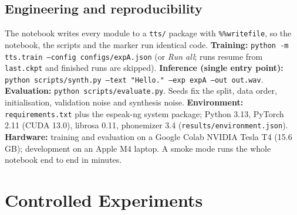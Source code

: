 \documentclass[11pt,a4paper]{article}
\begin{document}
\subsection{Engineering and reproducibility}
The notebook writes every module to a \texttt{tts/} package with \texttt{\%\%writefile}, so the notebook, the scripts and the marker run identical code. \textbf{Training:} \texttt{python -m tts.train --config configs/expA.json} (or \emph{Run all}; runs resume from \texttt{last.ckpt} and finished runs are skipped). \textbf{Inference (single entry point):} \texttt{python scripts/synth.py --text "Hello." --exp expA --out out.wav}. \textbf{Evaluation:} \texttt{python scripts/evaluate.py}. Seeds fix the split, data order, initialisation, validation noise and synthesis noise. \textbf{Environment:} \texttt{requirements.txt} plus the espeak-ng system package; Python 3.13, PyTorch 2.11 (CUDA 13.0), librosa 0.11, phonemizer 3.4 (\texttt{results/environment.json}). \textbf{Hardware:} training and evaluation on a Google Colab NVIDIA Tesla T4 (15.6\,GB); development on an Apple M4 laptop. A smoke mode runs the whole notebook end to end in minutes.

\section{Controlled Experiments}\label{sec:expdesign}
\end{document}
